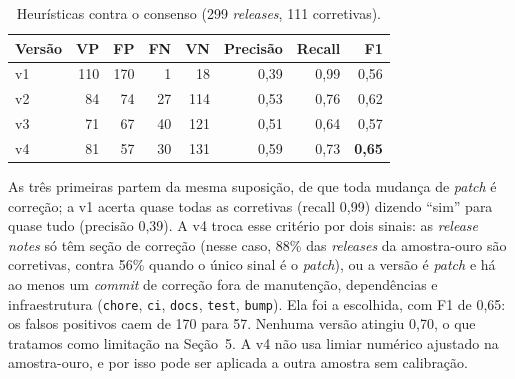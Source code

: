\begin{table}[ht]
\centering
\caption{Heurísticas contra o consenso (299 \textit{releases}, 111 corretivas).}
\label{tab:heuristica}
\small
\begin{tabular}{lrrrrrrr}
\hline
\textbf{Versão} & \textbf{VP} & \textbf{FP} & \textbf{FN} & \textbf{VN} &
\textbf{Precisão} & \textbf{Recall} & \textbf{F1} \\
\hline
v1 & 110 & 170 &  1 &  18 & 0,39 & 0,99 & 0,56 \\
v2 &  84 &  74 & 27 & 114 & 0,53 & 0,76 & 0,62 \\
v3 &  71 &  67 & 40 & 121 & 0,51 & 0,64 & 0,57 \\
v4 &  81 &  57 & 30 & 131 & 0,59 & 0,73 & \textbf{0,65} \\
\hline
\end{tabular}
\end{table}

As três primeiras partem da mesma suposição, de que toda mudança de \textit{patch} é
correção; a v1 acerta quase todas as corretivas (recall 0,99) dizendo ``sim'' para quase tudo
(precisão 0,39). A v4 troca esse critério por dois sinais: as \textit{release notes} só têm
seção de correção (nesse caso, 88\% das \textit{releases} da amostra-ouro são corretivas,
contra 56\% quando o único sinal é o \textit{patch}), ou a versão é \textit{patch} e há ao
menos um \textit{commit} de correção fora de manutenção, dependências e infraestrutura
(\texttt{chore}, \texttt{ci}, \texttt{docs}, \texttt{test}, \texttt{bump}). Ela foi a escolhida,
com F1 de 0,65: os falsos positivos caem de 170 para 57. Nenhuma versão atingiu 0,70, o que
tratamos como limitação na Seção~5. A v4 não usa limiar numérico ajustado na amostra-ouro, e
por isso pode ser aplicada a outra amostra sem calibração.

